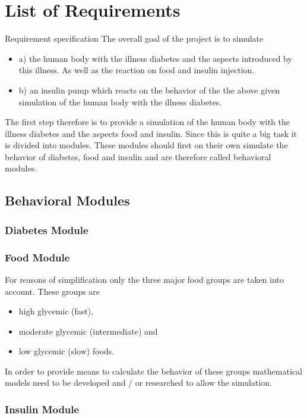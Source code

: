 \section{List of Requirements}
Requirement specification 
The overall goal of the project is to simulate
\begin{itemize}
  \item a) the human body with the illness diabetes and the aspects introduced
  by this illness. As well as the reaction on food and insulin injection.
  \item b) an insulin pump which reacts on the behavior of the the above given
  simulation of the human body with the illness diabetes.
\end{itemize}
The first step therefore is to provide a simulation of the human body with the
illness diabetes and the aspects food and insulin. 
Since this is quite a big task it is divided into modules. These modules should
first on their own simulate the behavior of diabetes, food and insulin and are
therefore called behavioral modules.

\subsection{Behavioral Modules}

\subsubsection{Diabetes Module}

\subsubsection{Food Module}
For reasons of simplification only the three major food groups are taken into
account.
These groups are 
\begin{itemize}
  \item high glycemic (fast),
  \item moderate glycemic (intermediate) and
  \item low glycemic (slow) foods.
\end{itemize}
In order to provide means to calculate the behavior of these groups
mathematical models need to be developed and / or researched to allow the
simulation.

\subsubsection{Insulin Module}

